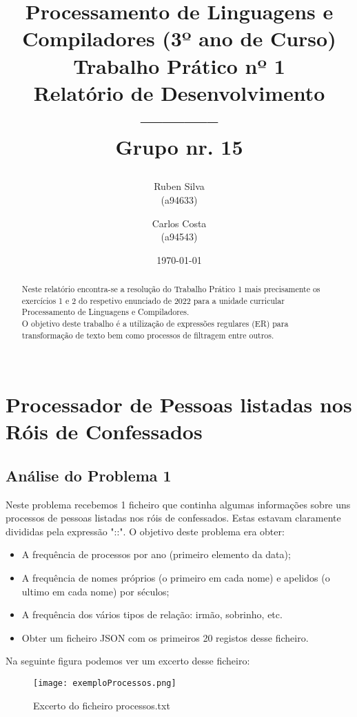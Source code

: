 \documentclass[11pt,a4paper]{report}%
\title{Processamento de Linguagens e Compiladores (3º ano de Curso)\\
       \textbf{Trabalho Prático nº 1
}\\ Relatório de Desenvolvimento\\-----------
\\Grupo nr. 15

       } %
\author{Ruben Silva\\ (a94633) \and Carlos Costa\\ (a94543)
       } %
\date{\today} %
\begin{document}
\maketitle %

\begin{abstract}  %
Neste relatório encontra-se a resolução do Trabalho Prático 1 mais
precisamente os exercícios 1 e 2 do respetivo enunciado de 2022 para 
a unidade curricular Processamento de Linguagens e Compiladores.\\
O objetivo deste trabalho é a utilização de expressões regulares (ER) para transformação de texto bem como processos de filtragem entre outros.\\\
\end{abstract}

\tableofcontents %

\chapter{Processador de Pessoas listadas nos Róis de Confessados} \label{chap:ex1} %

\section{Análise do Problema 1} \label{sec:analiseProb1}

Neste problema recebemos 1 ficheiro que continha algumas informações sobre uns processos de pessoas listadas nos róis de confessados. Estas  estavam claramente divididas pela expressão "::".
O objetivo deste problema era obter:

\begin{itemize}
  \item A frequência de processos por ano (primeiro elemento da data);
  \item A frequência de nomes próprios (o primeiro em cada nome) e apelidos (o ultimo em cada nome) por séculos;
  \item A frequência dos vários tipos de relação: irmão, sobrinho, etc.
  \item Obter um ficheiro JSON com os primeiros 20 registos desse ficheiro.
\end{itemize}

Na seguinte figura podemos ver um excerto desse ficheiro:\\
\begin{figure}[htbp]
\centerline{\texttt{[image: exemploProcessos.png]}}
\caption{Excerto do ficheiro processos.txt}
\label{fig}
\end{figure}
\end{document}
